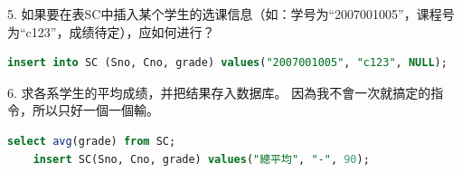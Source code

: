 \documentclass[12pt, a4paper]{report}
\begin{document}
5. 如果要在表SC中插入某个学生的选课信息（如：学号为“2007001005”，课程号为“c123”，成绩待定），应如何进行？\\

\begin{lstlisting}[language=SQL]
    insert into SC (Sno, Cno, grade) values("2007001005", "c123", NULL);
\end{lstlisting}

\begin{figure}[H] %
    \centering %
\end{figure}

6. 求各系学生的平均成绩，并把结果存入数据库。
因為我不會一次就搞定的指令，所以只好一個一個輸。\\

\begin{lstlisting}[language=SQL]
    select avg(grade) from SC;
    insert SC(Sno, Cno, grade) values("總平均", "-", 90);
\end{lstlisting}

\begin{figure}[H] %
    \centering %
\end{figure}
\end{document}
